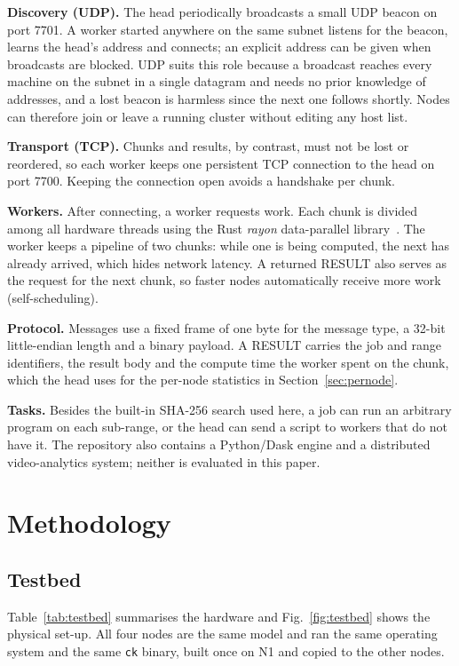 \documentclass[conference,10pt]{IEEEtran}
\begin{document}
\textbf{Discovery (UDP).} The head periodically broadcasts a small UDP beacon on port 7701. A worker started anywhere on the same subnet listens for the beacon, learns the head's address and connects; an explicit address can be given when broadcasts are blocked. UDP suits this role because a broadcast reaches every machine on the subnet in a single datagram and needs no prior knowledge of addresses, and a lost beacon is harmless since the next one follows shortly. Nodes can therefore join or leave a running cluster without editing any host list.

\textbf{Transport (TCP).} Chunks and results, by contrast, must not be lost or reordered, so each worker keeps one persistent TCP connection to the head on port 7700. Keeping the connection open avoids a handshake per chunk.

\textbf{Workers.} After connecting, a worker requests work. Each chunk is divided among all hardware threads using the Rust \emph{rayon} data-parallel library~\cite{rayon}. The worker keeps a pipeline of two chunks: while one is being computed, the next has already arrived, which hides network latency. A returned RESULT also serves as the request for the next chunk, so faster nodes automatically receive more work (self-scheduling).

\textbf{Protocol.} Messages use a fixed frame of one byte for the message type, a 32-bit little-endian length and a binary payload. A RESULT carries the job and range identifiers, the result body and the compute time the worker spent on the chunk, which the head uses for the per-node statistics in Section~\ref{sec:pernode}.

\textbf{Tasks.} Besides the built-in SHA-256 search used here, a job can run an arbitrary program on each sub-range, or the head can send a script to workers that do not have it. The repository also contains a Python/Dask engine and a distributed video-analytics system; neither is evaluated in this paper.

\section{Methodology}\label{sec:method}

\subsection{Testbed}
Table~\ref{tab:testbed} summarises the hardware and Fig.~\ref{fig:testbed} shows the physical set-up. All four nodes are the same model and ran the same operating system and the same \texttt{ck} binary, built once on N1 and copied to the other nodes.
\end{document}
